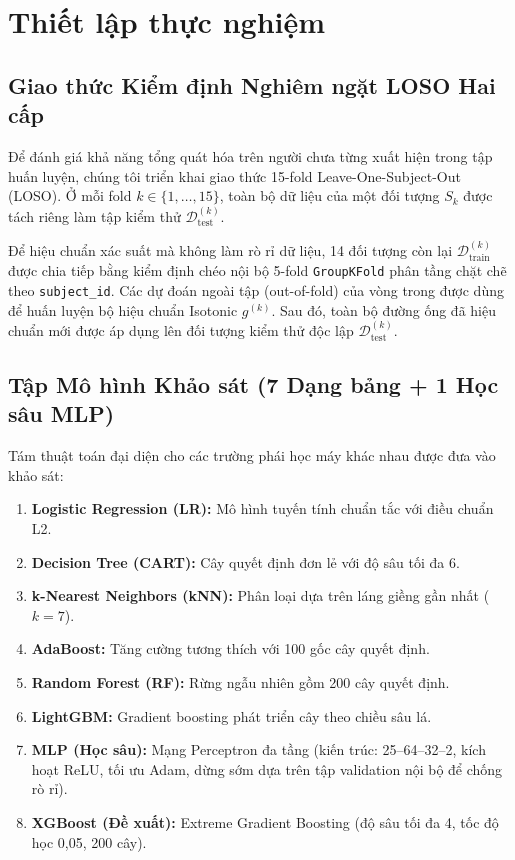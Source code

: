 \documentclass[conference]{IEEEtran}
\begin{document}
\section{Thiết lập thực nghiệm}

\subsection{Giao thức Kiểm định Nghiêm ngặt LOSO Hai cấp}
Để đánh giá khả năng tổng quát hóa trên người chưa từng xuất hiện trong tập huấn luyện, chúng tôi triển khai giao thức 15-fold Leave-One-Subject-Out (LOSO). Ở mỗi fold $k \in \{1, \dots, 15\}$, toàn bộ dữ liệu của một đối tượng $S_k$ được tách riêng làm tập kiểm thử $\mathcal{D}_{\text{test}}^{(k)}$.

Để hiệu chuẩn xác suất mà không làm rò rỉ dữ liệu, 14 đối tượng còn lại $\mathcal{D}_{\text{train}}^{(k)}$ được chia tiếp bằng kiểm định chéo nội bộ 5-fold \texttt{GroupKFold} phân tầng chặt chẽ theo \texttt{subject\_id}. Các dự đoán ngoài tập (out-of-fold) của vòng trong được dùng để huấn luyện bộ hiệu chuẩn Isotonic $g^{(k)}$. Sau đó, toàn bộ đường ống đã hiệu chuẩn mới được áp dụng lên đối tượng kiểm thử độc lập $\mathcal{D}_{\text{test}}^{(k)}$.

\subsection{Tập Mô hình Khảo sát (7 Dạng bảng + 1 Học sâu MLP)}
Tám thuật toán đại diện cho các trường phái học máy khác nhau được đưa vào khảo sát:
\begin{enumerate}
    \item \textbf{Logistic Regression (LR):} Mô hình tuyến tính chuẩn tắc với điều chuẩn L2.
    \item \textbf{Decision Tree (CART):} Cây quyết định đơn lẻ với độ sâu tối đa 6.
    \item \textbf{k-Nearest Neighbors (kNN):} Phân loại dựa trên láng giềng gần nhất ($k=7$).
    \item \textbf{AdaBoost:} Tăng cường tương thích với 100 gốc cây quyết định.
    \item \textbf{Random Forest (RF):} Rừng ngẫu nhiên gồm 200 cây quyết định.
    \item \textbf{LightGBM:} Gradient boosting phát triển cây theo chiều sâu lá.
    \item \textbf{MLP (Học sâu):} Mạng Perceptron đa tầng (kiến trúc: 25--64--32--2, kích hoạt ReLU, tối ưu Adam, dừng sớm dựa trên tập validation nội bộ để chống rò rỉ).
    \item \textbf{XGBoost (Đề xuất):} Extreme Gradient Boosting (độ sâu tối đa 4, tốc độ học 0,05, 200 cây).
\end{enumerate}
\end{document}
